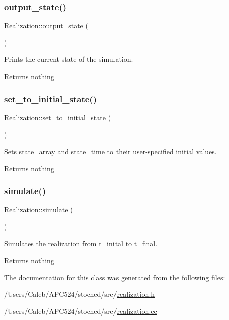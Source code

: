 \subsubsection{\texorpdfstring{output\+\_\+state()}{output\_state()}}
{\footnotesize\ttfamily Realization\+::output\+\_\+state (\begin{DoxyParamCaption}{ }\end{DoxyParamCaption})}



Prints the current state of the simulation. 

\begin{DoxyReturn}{Returns}
nothing 
\end{DoxyReturn}
\mbox{\label{class_realization_a24f8262338aa96a742ffc76f4128c2dd}} 
\subsubsection{\texorpdfstring{set\+\_\+to\+\_\+initial\+\_\+state()}{set\_to\_initial\_state()}}
{\footnotesize\ttfamily Realization\+::set\+\_\+to\+\_\+initial\+\_\+state (\begin{DoxyParamCaption}{ }\end{DoxyParamCaption})}



Sets state\+\_\+array and state\+\_\+time to their user-\/specified initial values. 

\begin{DoxyReturn}{Returns}
nothing 
\end{DoxyReturn}
\mbox{\label{class_realization_aa8516a01a8e87ca4748ea2f43ebd6b60}} 
\subsubsection{\texorpdfstring{simulate()}{simulate()}}
{\footnotesize\ttfamily Realization\+::simulate (\begin{DoxyParamCaption}{ }\end{DoxyParamCaption})}



Simulates the realization from t\+\_\+inital to t\+\_\+final. 

\begin{DoxyReturn}{Returns}
nothing 
\end{DoxyReturn}


The documentation for this class was generated from the following files\+:\begin{DoxyCompactItemize}
\item 
/\+Users/\+Caleb/\+A\+P\+C524/stoched/src/\hyperlink{realization_8h}{realization.\+h}\item 
/\+Users/\+Caleb/\+A\+P\+C524/stoched/src/\hyperlink{realization_8cc}{realization.\+cc}\end{DoxyCompactItemize}
